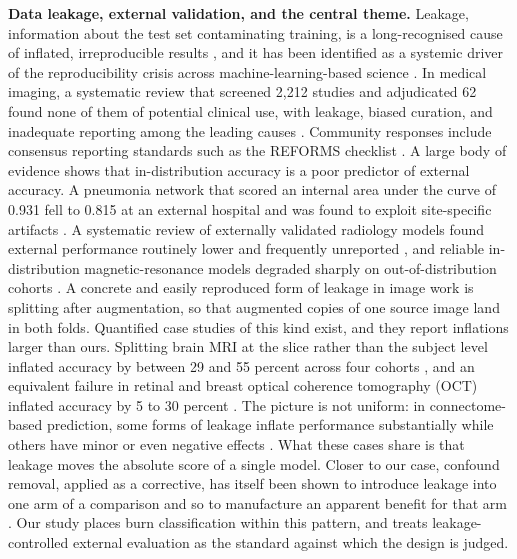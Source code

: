 \documentclass{melba}
\begin{document}
\textbf{Data leakage, external validation, and the central theme.} Leakage, information about the test set contaminating training, is a long-recognised cause of inflated, irreproducible results \citep{kaufman}, and it has been identified as a systemic driver of the reproducibility crisis across machine-learning-based science \citep{kapoor}. In medical imaging, a systematic review that screened 2{,}212 studies and adjudicated 62 found none of them of potential clinical use, with leakage, biased curation, and inadequate reporting among the leading causes \citep{roberts}. Community responses include consensus reporting standards such as the REFORMS checklist \citep{reforms}. A large body of evidence shows that in-distribution accuracy is a poor predictor of external accuracy. A pneumonia network that scored an internal area under the curve of 0.931 fell to 0.815 at an external hospital and was found to exploit site-specific artifacts \citep{zech2018}. A systematic review of externally validated radiology models found external performance routinely lower and frequently unreported \citep{yu2022}, and reliable in-distribution magnetic-resonance models degraded sharply on out-of-distribution cohorts \citep{martensson2020}. A concrete and easily reproduced form of leakage in image work is splitting after augmentation, so that augmented copies of one source image land in both folds. Quantified case studies of this kind exist, and they report inflations larger than ours. Splitting brain MRI at the slice rather than the subject level inflated accuracy by between 29 and 55 percent across four cohorts \citep{yagis2021}, and an equivalent failure in retinal and breast optical coherence tomography (OCT) inflated accuracy by 5 to 30 percent \citep{tampu2022}. The picture is not uniform: in connectome-based prediction, some forms of leakage inflate performance substantially while others have minor or even negative effects \citep{rosenblatt2024}. What these cases share is that leakage moves the absolute score of a single model. Closer to our case, confound removal, applied as a corrective, has itself been shown to introduce leakage into one arm of a comparison and so to manufacture an apparent benefit for that arm \citep{hamdan2023}. Our study places burn classification within this pattern, and treats leakage-controlled external evaluation as the standard against which the design is judged.
\end{document}
